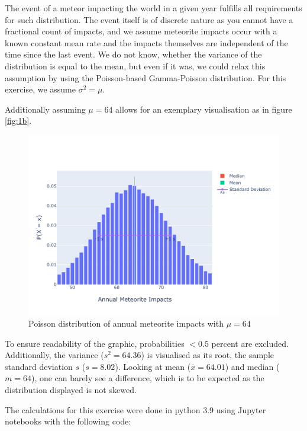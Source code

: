 The event of a meteor impacting the world in a given year fulfills all requirements for such distribution. The event itself is of discrete nature as you cannot have a fractional count of impacts, and we assume meteorite impacts occur with a known constant mean rate and the impacts themselves are independent of the time since the last event. We do not know, whether the variance of the distribution is equal to the mean, but even if it was, we could relax this assumption by using the Poisson-based Gamma-Poisson distribution. For this exercise, we assume $\sigma^2 = \mu$. 

Additionally assuming $\mu = 64$ allows for an exemplary visualisation as in figure \eqref{fig:1b}.

\begin{figure}[h]
\centering
\includegraphics[width=16cm]{pics/1b.pdf}
\caption{Poisson distribution of annual meteorite impacts with $\mu = 64$}
\label{fig:1b}
\end{figure}
\FloatBarrier

To ensure readability of the graphic, probabilities $<0.5$ percent are excluded. Additionally, the variance ($s^2 = 64.36$) is visualised as its root, the sample standard deviation $s$ ($s = 8.02$). Looking at mean ($\bar{x} = 64.01$) and median ($m = 64$), one can barely see a difference, which is to be expected as the distribution displayed is not skewed. 

The calculations for this exercise were done in python 3.9 using Jupyter notebooks with the following code: 


